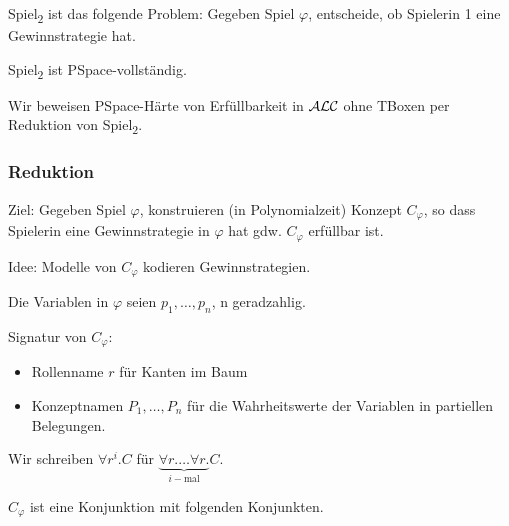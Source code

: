 \begin{definition}
    Spiel\textsubscript{2} ist das folgende Problem: Gegeben Spiel $\varphi$, entscheide, ob Spielerin 1 eine Gewinnstrategie hat.
\end{definition}

\begin{theorem}[Schaefer 1978]
    Spiel\textsubscript{2} ist PSpace-vollständig.
\end{theorem}

Wir beweisen PSpace-Härte von Erfüllbarkeit in $\mathcal{A}\mathcal{L}\mathcal{C}$ ohne TBoxen per Reduktion von Spiel\textsubscript{2}.

\subsubsection{Reduktion}

Ziel: Gegeben Spiel $\varphi$, konstruieren (in Polynomialzeit) Konzept $C_\varphi$, so dass Spielerin eine Gewinnstrategie in $\varphi$ hat gdw. $C_\varphi$ erfüllbar ist.

Idee: Modelle von $C_\varphi$ kodieren Gewinnstrategien.

Die Variablen in $\varphi$ seien $p_1, \ldots, p_n$, n geradzahlig.

Signatur von $C_\varphi$:
\begin{itemize}
    \item Rollenname $r$ für Kanten im Baum
    \item Konzeptnamen $P_1, \ldots, P_n$ für die Wahrheitswerte der Variablen in partiellen Belegungen.
\end{itemize}
Wir schreiben $\forall r^i.C$ für $\underbrace{\forall r.\ldots\forall r.}_{i-\text{mal}}C$.

$C_\varphi$ ist eine Konjunktion mit folgenden Konjunkten.

